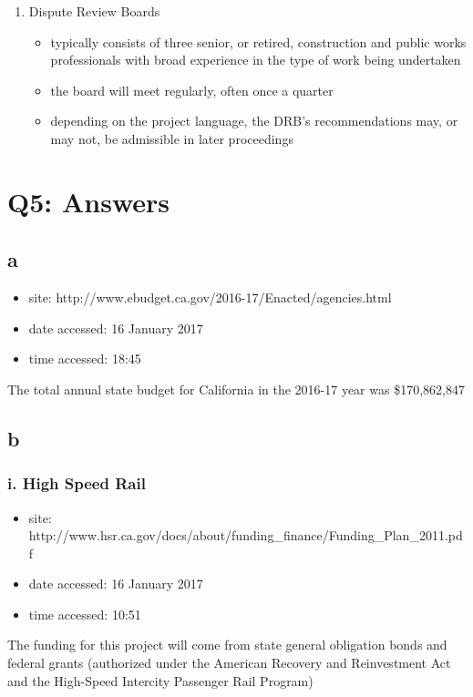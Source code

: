 \documentclass[12pt]{article} %
\begin{document}
\begin{enumerate}
\begin{itemize}
					\end{itemize}
				\item Dispute Review Boards
					\begin{itemize}
						\item typically consists of three senior, or retired, construction and public works professionals with broad experience in the type of work being undertaken
						\item the board will meet regularly, often once a quarter
						\item depending on the project language, the DRB's recommendations may, or may not, be admissible in later proceedings
					\end{itemize}
			\end{enumerate}


\section{Q5: Answers}

	\subsection{a}
		\begin{itemize}
			\item site: http://www.ebudget.ca.gov/2016-17/Enacted/agencies.html 
			\item date accessed: 16 January 2017
			\item time accessed: 18:45 
		\end{itemize}
		The total annual state budget for California in the 2016-17 year was \$170,862,847
	\subsection{b}
	
		\subsubsection{i. High Speed Rail}
			\begin{itemize}
				\item site: http://www.hsr.ca.gov/docs/about/funding\_finance/Funding\_Plan\_2011.pdf
				\item date accessed: 16 January 2017
				\item time accessed: 10:51
			\end{itemize}
		
			The funding for this project will come from state general obligation bonds and federal grants (authorized under the American Recovery and Reinvestment Act and the High-Speed Intercity Passenger Rail Program)
			
\end{document}
